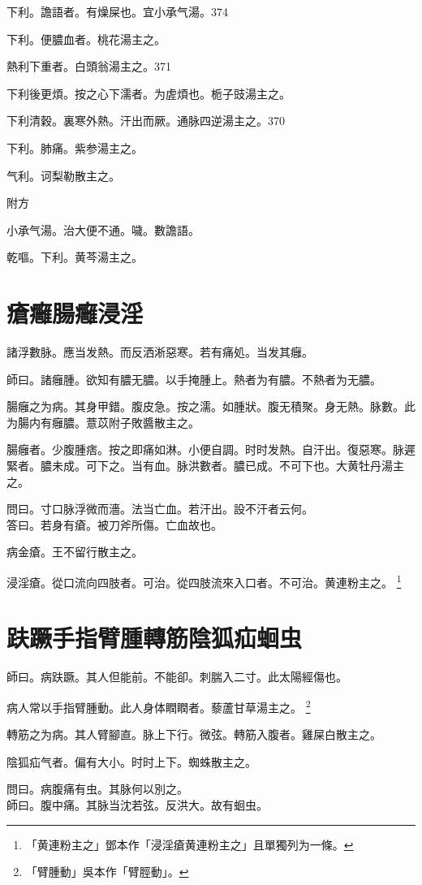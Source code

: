\documentclass[b5paper,twoside,zihao=-4,UTF8]{ctexbook}
\begin{document}
下利。譫語者。有燥屎也。宜{小}承气湯。374

下利。便膿血者。桃花湯主之。

熱利下重者。白頭翁湯主之。371

下利後更煩。按之心下濡者。为虗煩也。栀子豉湯主之。

下利清穀。裏寒外熱。汗出而厥。通脉四逆湯主之。370

下利。肺痛。紫参湯主之。

气利。诃梨勒散主之。

附方

小承气湯。治大便不通。噦。數譫語。

乾嘔。下利。黄芩湯主之。

\chapter{瘡癰腸癰浸淫}

諸浮數脉。應当发熱。而反洒淅惡寒。若有痛処。当发其癰。

師曰。諸癰腫。欲知有膿无膿。以手掩腫上。熱者为有膿。不熱者为无膿。

腸癰之为病。其身甲錯。腹皮急。按之濡。如腫狀。腹无積聚。身无熱。脉數。此为腸内有癰膿。薏苡附子敗醬散主之。

腸癰者。少腹腫痞。按之即痛如淋。小便自調。时时发熱。自汗出。復惡寒。脉遲緊者。膿未成。可下之。当有血。脉洪數者。膿已成。不可下也。大黄牡丹湯主之。

問曰。寸口脉浮微而濇。法当亡血。若汗出。設不汗者云何。\\
答曰。若身有瘡。被刀斧所傷。亡血故也。

病金瘡。王不留行散主之。

浸淫瘡。從口流向四肢者。可治。從四肢流來入口者。不可治。黄連粉主之。
	\footnote{「黄連粉主之」鄧本作「浸淫瘡黄連粉主之」且單獨列为一條。}

\chapter{趺蹶手指臂腫轉筋陰狐疝蛔虫}

師曰。病趺蹶。其人但能前。不能卻。刺腨入二寸。此太陽經傷也。

病人常以手指臂腫動。此人身体瞤瞤者。藜蘆甘草湯主之。
	\footnote{「臂腫動」吳本作「臂脛動」。}

轉筋之为病。其人臂腳直。脉上下行。微弦。轉筋入腹者。雞屎白散主之。

陰狐疝气者。偏有大小。时时上下。蜘蛛散主之。

問曰。病腹痛有虫。其脉何以別之。\\
師曰。腹中痛。其脉当沈若弦。反洪大。故有蛔虫。
\end{document}
